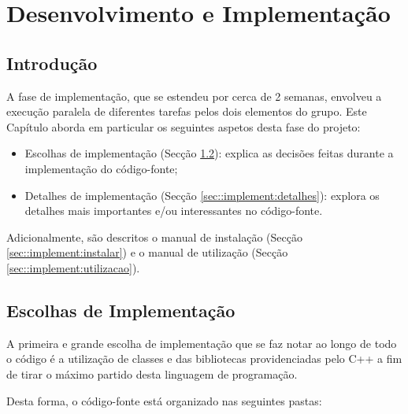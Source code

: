 \chapter{Desenvolvimento e Implementação}
\label{ch::implement}

\section{Introdução}
\label{sec::implement:intro}

A fase de implementação, que se estendeu por cerca de 2 semanas, envolveu a execução paralela de diferentes tarefas pelos dois elementos do grupo. Este Capítulo aborda em particular os seguintes aspetos desta fase do projeto:

\begin{itemize}%
	\item Escolhas de implementação (Secção \ref{sec::implement:escolhas}): explica as decisões feitas durante a implementação do código-fonte;
	\item Detalhes de implementação (Secção \ref{sec::implement:detalhes}): explora os detalhes mais importantes e/ou interessantes no código-fonte.
\end{itemize}

Adicionalmente, são descritos o manual de instalação (Secção \ref{sec::implement:instalar}) e %
o manual de utilização (Secção \ref{sec::implement:utilizacao}). %


\section{Escolhas de Implementação}
\label{sec::implement:escolhas}

A primeira e grande escolha de implementação que se faz notar ao longo de todo o código é a utilização de classes e das bibliotecas providenciadas pelo C++ a fim de tirar o máximo partido desta linguagem de programação.

Desta forma, o código-fonte está organizado nas seguintes pastas:

